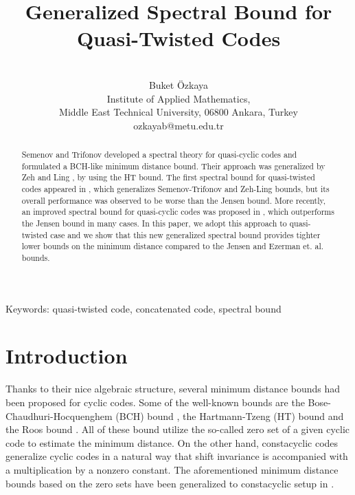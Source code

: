 \documentclass[11pt]{amsart}
\theoremstyle{plain}
\theoremstyle{definition}
\numberwithin{equation}{section}
\begin{document}
\title{Generalized Spectral Bound for Quasi-Twisted Codes}
\maketitle
\pagestyle{plain}

\author
{ {\scshape \begin{center} Buket \"{O}zkaya \end{center}}
\vspace{0.1cm} \small
\begin{center} Institute of Applied Mathematics,\\ Middle East Technical University, 06800 Ankara, Turkey\\
ozkayab@metu.edu.tr\\
\end{center}
}

\begin{abstract}
Semenov and Trifonov \cite{ST} developed a spectral theory for quasi-cyclic codes and formulated a BCH-like minimum distance bound. Their approach was generalized by Zeh and Ling \cite{LZ}, by using the HT bound.  The first spectral bound for quasi-twisted codes appeared in \cite{ELLOT}, which generalizes Semenov-Trifonov and Zeh-Ling bounds, but its overall performance was observed to be worse than the Jensen bound. More recently, an improved spectral bound for quasi-cyclic codes was proposed in \cite{LELO}, which outperforms the Jensen bound in many cases. In this paper, we adopt this approach to quasi-twisted case and we show that this new generalized spectral bound provides tighter lower bounds on the minimum distance compared to the Jensen and Ezerman et. al. bounds.
\end{abstract}


Keywords: quasi-twisted code, concatenated code, spectral bound


\section{Introduction}
\label{intro}
Thanks to their nice algebraic structure, several minimum distance bounds had been proposed for cyclic codes. Some of the well-known bounds are the Bose-Chaudhuri-Hocquenghem (BCH) bound \cite{BC,H}, the Hartmann-Tzeng (HT) bound \cite{HT} and the Roos bound \cite{R2}. All of these bound utilize the so-called zero set of a given cyclic code to estimate the minimum distance. On the other hand, constacyclic codes generalize cyclic codes in a natural way that shift invariance is accompanied with a multiplication by a nonzero constant. The aforementioned minimum distance bounds based on the zero sets have been generalized to constacyclic setup in \cite{RZ}.
 
\end{document}
